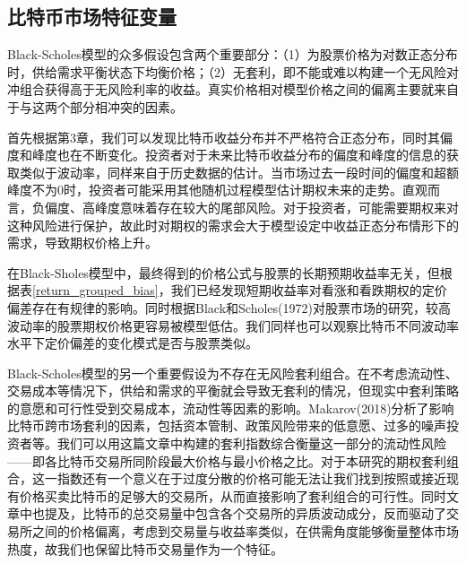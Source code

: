 {\subsection{比特币市场特征变量}
\par{Black-Scholes模型的众多假设包含两个重要部分：（1）为股票价格为对数正态分布时，供给需求平衡状态下均衡价格；（2）无套利，即不能或难以构建一个无风险对冲组合获得高于无风险利率的收益。真实价格相对模型价格之间的偏离主要就来自于与这两个部分相冲突的因素。}
\par{首先根据第3章，我们可以发现比特币收益分布并不严格符合正态分布，同时其偏度和峰度也在不断变化。投资者对于未来比特币收益分布的偏度和峰度的信息的获取类似于波动率，同样来自于历史数据的估计。当市场过去一段时间的偏度和超额峰度不为0时，投资者可能采用其他随机过程模型估计期权未来的走势。直观而言，负偏度、高峰度意味着存在较大的尾部风险。对于投资者，可能需要期权来对这种风险进行保护，故此时对期权的需求会大于模型设定中收益正态分布情形下的需求，导致期权价格上升。}
\par{在Black-Sholes模型中，最终得到的价格公式与股票的长期预期收益率无关，但根据表\ref{return_grouped_bias}，我们已经发现短期收益率对看涨和看跌期权的定价偏差存在有规律的影响。同时根据Black和Scholes(1972)对股票市场的研究，较高波动率的股票期权价格更容易被模型低估。我们同样也可以观察比特币不同波动率水平下定价偏差的变化模式是否与股票类似。}
\par{
    Black-Scholes模型的另一个重要假设为不存在无风险套利组合。在不考虑流动性、交易成本等情况下，供给和需求的平衡就会导致无套利的情况，但现实中套利策略的意愿和可行性受到交易成本，流动性等因素的影响。Makarov(2018)分析了影响比特币跨市场套利的因素，包括资本管制、政策风险带来的低意愿、过多的噪声投资者等\cite{Makarov-2018}。我们可以用这篇文章中构建的套利指数综合衡量这一部分的流动性风险——即各比特币交易所同阶段最大价格与最小价格之比。对于本研究的期权套利组合，这一指数还有一个意义在于过度分散的价格可能无法让我们找到按照或接近现有价格买卖比特币的足够大的交易所，从而直接影响了套利组合的可行性。同时文章中也提及，比特币的总交易量中包含各个交易所的异质波动成分，反而驱动了交易所之间的价格偏离，考虑到交易量与收益率类似，在供需角度能够衡量整体市场热度，故我们也保留比特币交易量作为一个特征。

}}
